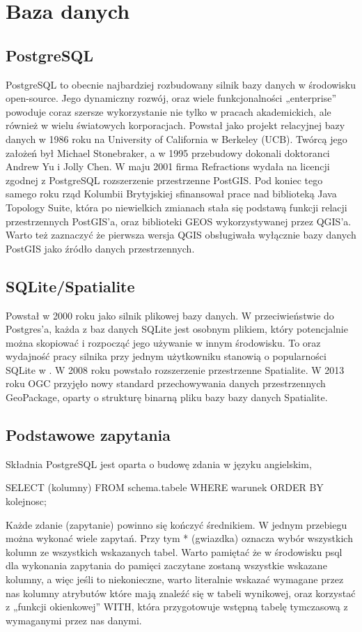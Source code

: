 \documentclass[12pt,a4paper]{book}
\begin{document}
\chapter{Baza danych}
\section{PostgreSQL}
PostgreSQL to obecnie najbardziej rozbudowany silnik bazy danych w środowisku open-source. Jego dynamiczny rozwój, oraz wiele funkcjonalności „enterprise” powoduje coraz szersze wykorzystanie nie tylko w pracach akademickich, ale również w wielu światowych korporacjach. Powstał jako projekt relacyjnej bazy danych w 1986 roku na University of California w Berkeley (UCB). Twórcą jego założeń był Michael Stonebraker, a w 1995 przebudowy dokonali doktoranci Andrew Yu i Jolly Chen. W maju 2001 firma Refractions wydała na licencji zgodnej z PostgreSQL rozszerzenie przestrzenne PostGIS. Pod koniec tego samego roku rząd Kolumbii Brytyjskiej sfinansował prace nad biblioteką Java Topology Suite, która po niewielkich zmianach stała się podstawą funkcji relacji przestrzennych PostGIS’a, oraz biblioteki GEOS wykorzystywanej przez QGIS’a. Warto też zaznaczyć że pierwsza wersja QGIS obsługiwała wyłącznie bazy danych PostGIS jako źródło danych przestrzennych.

\section{SQLite/Spatialite}
Powstał w 2000 roku jako silnik plikowej bazy danych. W przeciwieństwie do Postgres’a, każda z baz danych SQLite jest osobnym plikiem, który potencjalnie można skopiować i rozpocząć jego używanie w innym środowisku. To oraz wydajność pracy silnika przy jednym użytkowniku stanowią o popularności SQLite w . W 2008 roku powstało rozszerzenie przestrzenne Spatialite. W 2013 roku OGC przyjęło nowy standard przechowywania danych przestrzennych GeoPackage, oparty o strukturę binarną pliku bazy bazy danych Spatialite.

\section{Podstawowe zapytania}
Składnia PostgreSQL jest oparta o budowę zdania w języku angielskim,

SELECT (kolumny) FROM schema.tabele WHERE warunek ORDER BY kolejnosc;

Każde zdanie (zapytanie) powinno się kończyć średnikiem. W jednym przebiegu można wykonać wiele zapytań. Przy tym * (gwiazdka) oznacza wybór wszystkich kolumn ze wszystkich wskazanych tabel. Warto pamiętać że w środowisku psql dla wykonania zapytania do pamięci zaczytane zostaną wszystkie wskazane kolumny, a więc jeśli to niekonieczne, warto literalnie wskazać wymagane przez nas kolumny atrybutów które mają znaleźć się w tabeli wynikowej, oraz korzystać z „funkcji okienkowej” WITH, która przygotowuje wstępną tabelę tymczasową z wymaganymi przez nas danymi.
\end{document}
